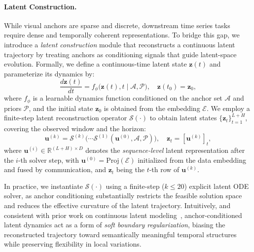 \paragraph{Latent Construction.}
While visual anchors are sparse and discrete, downstream time series tasks require dense and temporally coherent representations.
To bridge this gap, we introduce a \emph{latent construction} module that reconstructs a continuous latent trajectory by treating anchors as conditioning signals that guide latent-space evolution.
Formally, we define a continuous-time latent state $\mathbf{z}(t)$ and parameterize its dynamics by:
\begin{equation}
\frac{d\mathbf{z}(t)}{dt}
= f_{\phi}\big(\mathbf{z}(t), t \mid \mathcal{A}, \mathcal{P}\big),
\quad \mathbf{z}(t_0) = \mathbf{z}_0,
\end{equation}
where $f_{\phi}$ is a learnable dynamics function conditioned on the anchor set $\mathcal{A}$ and priors $\mathcal{P}$, and the initial state $\mathbf{z}_0$ is obtained from the embedding $\mathcal{E}$. We employ a finite-step latent reconstruction operator $\mathcal{S}(\cdot)$ to obtain latent states
$\{\mathbf{z}_t\}_{t=1}^{L+H}$, covering the observed window and the horizon:
\begin{equation}
\mathbf{u}^{(k)} = \mathcal{S}^{(k)}\!\big(\cdots\mathcal{S}^{(1)}(\mathbf{u}^{(0)}, \mathcal{A}, \mathcal{P})\big), \quad \mathbf{z}_t = [\mathbf{u}^{(k)}]_t,
\end{equation}
where $\mathbf{u}^{(i)} \in \mathbb{R}^{(L+H)\times D}$ denotes the \emph{sequence-level} latent representation after the $i$-th solver step, with $\mathbf{u}^{(0)}=\text{Proj}(\mathcal{E})$ initialized from the data embedding and fused by communication, and $\mathbf{z}_t$ being the $t$-th row of $\mathbf{u}^{(k)}$.

In practice, we instantiate $\mathcal{S}(\cdot)$ using a finite-step ($k \leq 20$) explicit latent ODE solver, as anchor conditioning substantially restricts the feasible solution space and reduces the effective curvature of the latent trajectory.
Intuitively, and consistent with prior work on continuous latent modeling~\cite{dormand1980family,rubanova2019latent},
anchor-conditioned latent dynamics act as a form of \emph{soft boundary regularization}, biasing the reconstructed trajectory toward semantically meaningful temporal structures while preserving flexibility in local variations.

